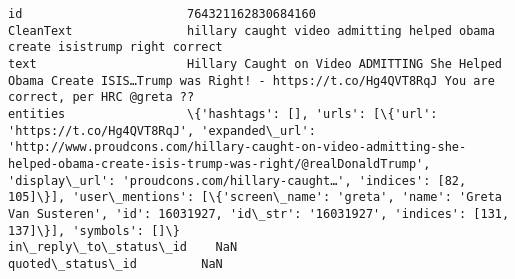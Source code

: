 \documentclass[11pt]{article}
\begin{document}
\begin{Verbatim}[commandchars=\\\{\}]
id                       764321162830684160                                                                                                                                                                                                                                                                                                                                                                                                                     
CleanText                hillary caught video admitting helped obama create isistrump right correct                                                                                                                                                                                                                                                                                                                                                             
text                     Hillary Caught on Video ADMITTING She Helped Obama Create ISIS…Trump was Right! - https://t.co/Hg4QVT8RqJ You are correct, per HRC @greta ??                                                                                                                                                                                                                                                                                           
entities                 \{'hashtags': [], 'urls': [\{'url': 'https://t.co/Hg4QVT8RqJ', 'expanded\_url': 'http://www.proudcons.com/hillary-caught-on-video-admitting-she-helped-obama-create-isis-trump-was-right/@realDonaldTrump', 'display\_url': 'proudcons.com/hillary-caught…', 'indices': [82, 105]\}], 'user\_mentions': [\{'screen\_name': 'greta', 'name': 'Greta Van Susteren', 'id': 16031927, 'id\_str': '16031927', 'indices': [131, 137]\}], 'symbols': []\}
in\_reply\_to\_status\_id    NaN                                                                                                                                                                                                                                                                                                                                                                                                                                    
quoted\_status\_id         NaN                                                                                                                                                                                                                                                                                                                                                                                                                                    

\end{Verbatim}
\end{document}
